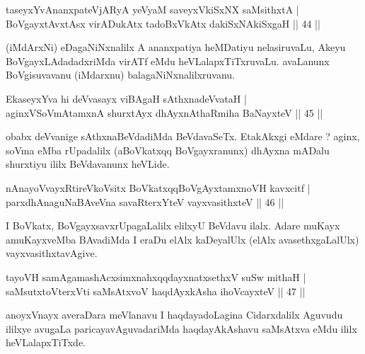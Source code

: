 
\begin{shl}
taseyxYvAnanxpateVjARyA yeVyaM saveyxV\s kiSxNX saMsithxtA |\\
BoVgayxtAvxtAsx virADukAtx tadoBxVkAtx dakiSxNAkiSxgaH \hfill || 44 || 
\end{shl}

\begin{artha}
(iMdArxNi) eDagaNiNxnalilx A ananxpatiya heMDatiyu nelasiruvaLu, Akeyu BoVgayxLAdadadxriMda virATf eMdu heVLalapxTiTxruvaLu. avaLanunx BoVgisuvavanu (iMdarxnu) balagaNiNxnalilxruvanu.
\end{artha}


\begin{shl}
EkaseyxYva hi deVvasayx viBAgaH sAthxnadeVvataH |\\
aginxVSoVmAtamxnA shurxtAyx dhAyxnAthaRmiha BaNayxteV \hfill || 45 || 
\end{shl}

\begin{artha}
obabx deVvanige sAthxnaBeVdadiMda BeVdavaSeTx. EtakAkxgi eMdare ? aginx, soVma eMba rUpadalilx (aBoVkatxqq BoVgayxranunx) dhAyxna mADalu shurxtiyu ililx BeVdavanunx heVLide.
\end{artha}

\begin{shl}
nAnayoVvayxRtireVkoV\s sitx BoVkatxqqBoVgAyxtamxnoVH kavxcitf |\\
parxdhAnaguNaBAveVna savaRterxYteV vayxvasithxteV \hfill || 46 || 
\end{shl}

\begin{artha}
I BoVkatx, BoVgayxsavxrUpagaLalilx elilxyU BeVdavu ilalx. Adare muKayx amuKayxveMba BAvadiMda I eraDu elAlx kaDeyalUlx (elAlx avasethxgaLalUlx) vayxvasithxtavAgive.
\end{artha}


\begin{shl}
tayoVH samAgamashAcxsimxnahxqqdayxnatxsethxV suSw mithaH |\\
saMsutxtoV\s terxVti saMsAtxvoV haqdAyxkAsha ihoVcayxteV \hfill || 47 || 
\end{shl}

\begin{artha}
anoyxVnayx averaDara meVlanavu I haqdayadoLagina Cidarxdalilx Aguvudu ililxye avugaLa paricayavAguvadariMda haqdayAkAshavu saMsAtxva eMdu ililx heVLalapxTiTxde.
\end{artha}

